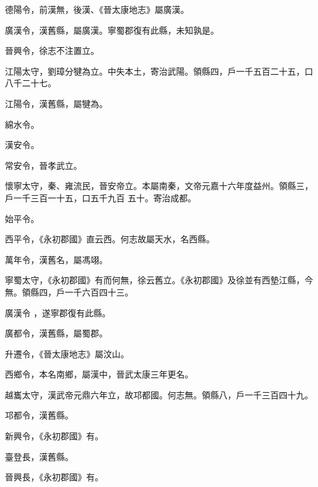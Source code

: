 \begin{pinyinscope}
 德陽令，前漢無，後漢、《晉太康地志》屬廣漢。



 廣漢令，漢舊縣，屬廣漢。寧蜀郡復有此縣，未知孰是。



 晉興令，徐志不注置立。



 江陽太守，劉璋分犍為立。中失本土，寄治武陽。領縣四，戶一千五百二十五，口八千二十七。



 江陽令，漢舊縣，屬犍為。


綿水令。


漢安令。



 常安令，晉孝武立。



 懷寧太守，秦、雍流民，晉安帝立。本屬南秦，文帝元嘉十六年度益州。領縣三，戶一千三百一十五，口五千九百
 五十。寄治成都。


始平令。



 西平令，《永初郡國》直云西。何志故屬天水，名西縣。



 萬年令，漢舊名，屬馮翊。



 寧蜀太守，《永初郡國》有而何無，徐云舊立。《永初郡國》及徐並有西墊江縣，今無。領縣四，戶一千六百四十三。


廣漢令
 ，遂寧郡復有此縣。



 廣都令，漢舊縣，屬蜀郡。



 升遷令，《晉太康地志》屬汶山。



 西鄉令，本名南鄉，屬漢中，晉武太康三年更名。



 越巂太守，漢武帝元鼎六年立，故邛都國。何志無。領縣八，戶一千三百四十九。



 邛都令，漢舊縣。



 新興令，《永初郡國》有。



 臺登長，漢舊縣。



 晉興長，《永初郡國》有。




\end{pinyinscope}
